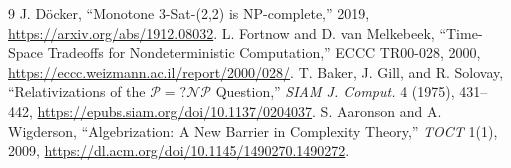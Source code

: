 \documentclass[11pt]{article}
\begin{document}
\begin{thebibliography}{9}
 J. D\"ocker, ``Monotone 3-Sat-(2,2) is NP-complete,'' 2019,
\url{https://arxiv.org/abs/1912.08032}.
 L. Fortnow and D. van Melkebeek, ``Time-Space Tradeoffs for
Nondeterministic Computation,'' ECCC TR00-028, 2000,
\url{https://eccc.weizmann.ac.il/report/2000/028/}.
 T. Baker, J. Gill, and R. Solovay, ``Relativizations of the
$\mathcal P=?\mathcal{NP}$ Question,'' \emph{SIAM J. Comput.} 4 (1975), 431--442,
\url{https://epubs.siam.org/doi/10.1137/0204037}.
 S. Aaronson and A. Wigderson, ``Algebrization: A New Barrier in Complexity
Theory,'' \emph{TOCT} 1(1), 2009,
\url{https://dl.acm.org/doi/10.1145/1490270.1490272}.
\end{thebibliography}

\end{document}
